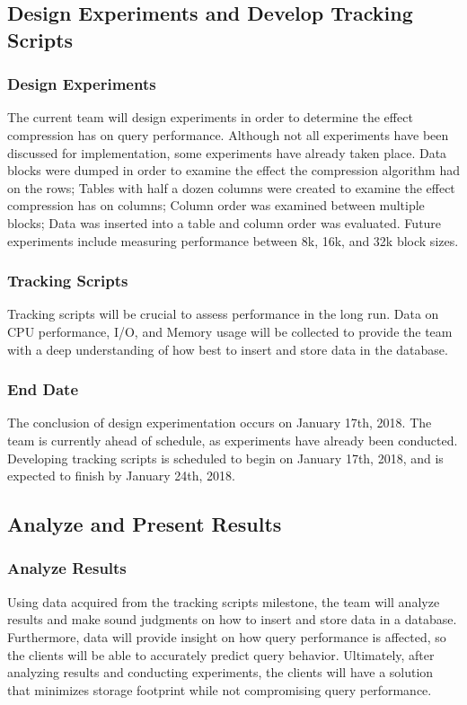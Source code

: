 \documentclass[10pt]{article}
\begin{document}
\subsection{Design Experiments and Develop Tracking Scripts}
\subsubsection{Design Experiments}
The current team will design experiments in order to determine the effect compression has on query performance. Although not all experiments have been discussed for implementation, some experiments have already taken place. Data blocks were dumped in order to examine the effect the compression algorithm had on the rows; Tables with half a dozen columns were created to examine the effect compression has on columns; Column order was examined between multiple blocks; Data was inserted into a table and column order was evaluated. Future experiments include measuring performance between 8k, 16k, and 32k block sizes. 
\subsubsection{Tracking Scripts}
Tracking scripts will be crucial to assess performance in the long run. Data on CPU performance, I/O, and Memory usage will be collected to provide the team with a deep understanding of how best to insert and store data in the database.
\subsubsection{End Date}
The conclusion of design experimentation occurs on January 17th, 2018. The team is currently ahead of schedule, as experiments have already been conducted. Developing tracking scripts is scheduled to begin on January 17th, 2018, and is expected to finish by January 24th, 2018. 

\subsection{Analyze and Present Results}
\subsubsection{Analyze Results}
Using data acquired from the tracking scripts milestone, the team will analyze results and make sound judgments on how to insert and store data in a database. Furthermore, data will provide insight on how query performance is affected, so the clients will be able to accurately predict query behavior. Ultimately, after analyzing results and conducting experiments, the clients will have a solution that minimizes storage footprint while not compromising query performance.
\end{document}
